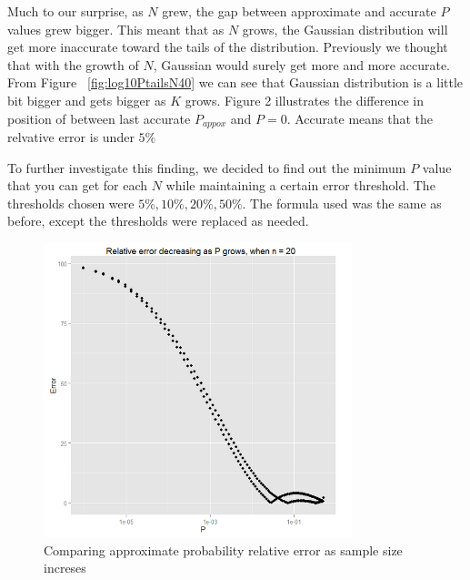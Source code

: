 \documentclass[12pt]{article}
\begin{document}
Much to our surprise, as $N$ grew, the gap between approximate and accurate $P$ values grew bigger. This meant that as $N$ grows, the Gaussian distribution will get more inaccurate toward the tails of the distribution. Previously we thought that with the growth of $N$, Gaussian would surely get more and more accurate.
From Figure ~\ref{fig:log10PtailsN40} we can see that Gaussian distribution is a little bit bigger and gets bigger as $K$ grows. Figure 2 illustrates the difference in position of between last accurate $P_{appox}$ and $P = 0$. Accurate means that the relvative error is under $5\%$

To further investigate this finding, we decided to find out the minimum $P$ value that you can get for each $N$ while maintaining a certain error threshold. The thresholds chosen were $5\%, 10\%, 20\%, 50\%$. The formula used was the same as before, except the thresholds were replaced as needed.

\begin{figure}[!ht]
	\centering
  \includegraphics[width=0.8\textwidth]{RelativeErrorDecreasingPgrowsN20}
	\caption{Comparing approximate probability relative error as sample size increses}
	\label{fig:PvsN}
\end{figure}
\end{document}
